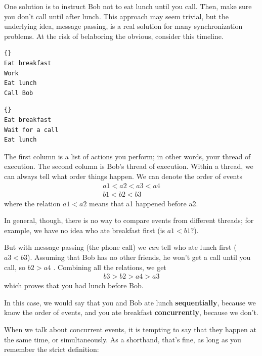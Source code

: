 \documentclass{book}
\begin{document}
One solution is to instruct Bob not to eat lunch until you call.
Then, make sure you don't call until after lunch.  This approach may
seem trivial, but the underlying idea, message passing, is a real
solution for many synchronization problems.
At the risk of belaboring the obvious, consider this timeline.

\begin{minipage}[t]{0.4\textwidth}
    \begin{lstlisting}[title={Thread A (You)}]{}
Eat breakfast 
Work          
Eat lunch     
Call Bob
\end{lstlisting}
\end{minipage}
\hfill
\begin{minipage}[t]{0.4\textwidth}
    \begin{lstlisting}[title={Thread B (Bob)}]{}
Eat breakfast
Wait for a call
Eat lunch
\end{lstlisting}
\end{minipage}

The first column is a list of actions you perform; in other words,
your thread of execution.  The second column is Bob's thread of
execution.  Within a thread, we can always tell what order things
happen.  We can denote the order of events
%
\begin{eqnarray*}
    a1 < a2 < a3 < a4  \\
    b1 < b2 < b3
\end{eqnarray*}
%
where the relation $a1 < a2$ means that a1 happened before a2.

In general, though, there is no way to compare events from different
threads; for example, we have no idea who ate breakfast first (is $a1
    < b1$?).

But with message passing (the phone call) we {\em can} tell who ate
lunch first ($a3 < b3$).  Assuming that Bob has no other friends, he
won't get a call until you call, so $b2 > a4$ .  Combining all the
relations, we get
%
\begin{eqnarray*}
    b3 > b2 > a4 > a3
\end{eqnarray*}
%
which proves that you had lunch before Bob.

In this case, we would say that you and Bob ate lunch
    {\bf sequentially}, because we know the order of events, and you
ate breakfast {\bf concurrently}, because we don't.

When we talk about concurrent events, it is tempting to say
that they happen at the same time, or simultaneously.  As a
shorthand, that's fine, as long as you remember the strict
definition:
\end{document}
